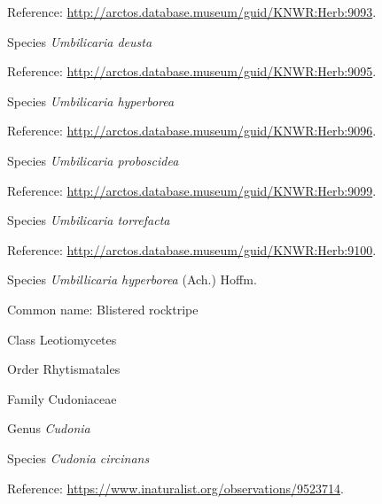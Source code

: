 \documentclass[9pt, article]{memoir}
\begin{document}
\begin{multicols}{2}
Reference: 
\url{http://arctos.database.museum/guid/KNWR:Herb:9093}.

\vspace{6pt}\noindent\hspace{36pt}Species \textit{Umbilicaria deusta}


Reference: 
\url{http://arctos.database.museum/guid/KNWR:Herb:9095}.

\vspace{6pt}\noindent\hspace{36pt}Species \textit{Umbilicaria hyperborea}


Reference: 
\url{http://arctos.database.museum/guid/KNWR:Herb:9096}.

\vspace{6pt}\noindent\hspace{36pt}Species \textit{Umbilicaria proboscidea}


Reference: 
\url{http://arctos.database.museum/guid/KNWR:Herb:9099}.

\vspace{6pt}\noindent\hspace{36pt}Species \textit{Umbilicaria torrefacta}


Reference: 
\url{http://arctos.database.museum/guid/KNWR:Herb:9100}.

\vspace{6pt}\noindent\hspace{36pt}Species \textit{Umbillicaria hyperborea} (Ach.) Hoffm.


Common name: Blistered rocktripe

\vspace{6pt}\noindent\hspace{12pt}Class Leotiomycetes


\vspace{6pt}\noindent\hspace{18pt}Order Rhytismatales


\vspace{6pt}\noindent\hspace{24pt}Family Cudoniaceae


\vspace{6pt}\noindent\hspace{30pt}Genus \textit{Cudonia}


\vspace{6pt}\noindent\hspace{36pt}Species \textit{Cudonia circinans}


Reference: 
\url{https://www.inaturalist.org/observations/9523714}.


\end{multicols}
\end{document}
